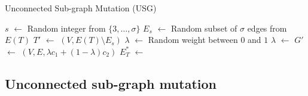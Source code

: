 \documentclass[twoside]{article}
\begin{document}
\begin{algorithm}[H]
\caption{Unconnected Sub-graph Mutation (USG)}
\label{alg:usg}
\begin{algorithmic}[1]
    \State $s$ $\gets$ Random integer from $\{3, \ldots, \sigma\}$
    \State $E_s$ $\gets$ Random subset of $\sigma$ edges from $E(T)$
    \State $T'$ $\gets$ $(V, E(T) \setminus E_s)$
    \State $\lambda$ $\gets$ Random weight between $0$ and $1$
        \State $\lambda$ $\gets$ 
    \EndIf
    \State $G'$ $\gets$ $(V, E, \lambda c_1 + (1 - \lambda) c_2)$
    \State $E_T^{*}$ $\gets$  
    \State {}
\end{algorithmic}
\end{algorithm}

\subsection{Unconnected sub-graph mutation}
\end{document}
